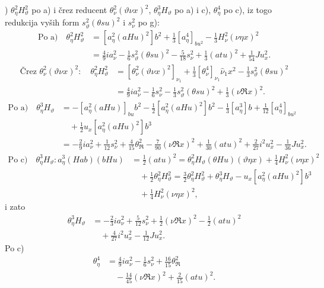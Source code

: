 \documentclass[11pt]{article}
\newcommand{\R}{\mathfrak R}
\begin{document}
) $\theta_\eta^2H_\vartheta^2$ po \mbox{a)} i črez reducent $\theta_\nu^2(\vartheta\nu x)^2$, $\theta_\eta^3H_\vartheta$ po \mbox{a)} i \mbox{c)}, $\theta_\eta^4$ po \mbox{c)}, iz togo redukcija vyših form $s_\vartheta^2(\theta su)^2$ i $s_\nu^2$ po \mbox{g)}:
\begingroup\scriptsize
\[
\begin{aligned}
\text{Po }\mathrm{a)}\quad
\theta_\eta^2H_\vartheta^2&=[a_\eta^2(aHu)^2]b^2+\frac13[a_\eta^4]_{bu^2}-\frac13H_\nu^2(\nu\eta x)^2\\
&=\frac49ia_\nu^2-\frac16s_\vartheta^2(\theta su)^2-\frac5{18}s_\nu^2+\frac13(atu)^2+\frac1{54}Ju_x^2.
\end{aligned}
\]
\[
\begin{aligned}
\text{Črez }\theta_\nu^2(\vartheta\nu x)^2:
\quad\theta_\eta^2H_\vartheta^2
&=[\theta_\nu^2(\vartheta\nu x)^2]_{\nu_1}+\frac13[\theta_\nu^4]_{\nu_1}\hat\nu_1x^2-\frac13s_\vartheta^2(\theta su)^2\\
&=\frac49ia_\nu^2-\frac16s_\nu^2-\frac13s_\vartheta^2(\theta su)^2+\frac13(\nu\R x)^2.
\end{aligned}
\]
\[
\begin{aligned}
\text{Po }\mathrm{a)}\quad
\theta_\eta^3H_\vartheta&=-[a_\eta^2(aHu)]_{bu}b^2-\frac12[a_\eta^2(aHu)^2]b^2-\frac13[a_\eta^3]b+\frac1{12}[a_\eta^4]_{bu^2}\\
&\quad+\frac12u_x[a_\eta^2(aHu)^2]b^3\\
&=-\frac29ia_\nu^2+\frac1{12}s_\nu^2+\frac4{15}\theta_\R^2-\frac7{90}(\nu\R x)^2+\frac1{30}(atu)^2+\frac2{27}i^2u_x^2-\frac1{36}Ju_x^2.
\end{aligned}
\]
\[
\begin{aligned}
\text{Po }\mathrm{c)}\quad
\theta_\eta^3H_\vartheta:
 a_\eta^3(Hab)(bHu)&=\frac12(atu)^2
=\theta_\eta^2H_\vartheta(\theta Hu)(\vartheta\eta x)+\frac14H_\nu^2(\nu\eta x)^2\\
&\quad+\frac12\theta_\eta^2H_\vartheta^2
=\frac32\theta_\eta^2H_\vartheta^2+\theta_\eta^3H_\vartheta-u_x[a_\eta^2(aHu)^2]b^3\\
&\quad+\frac14H_\nu^2(\nu\eta x)^2,
\end{aligned}
\]
\endgroup
i zato
\begingroup\small
\[
\begin{aligned}
\theta_\eta^3H_\vartheta&=-\frac23ia_\nu^2+\frac5{12}s_\nu^2+\frac12(\nu\R x)^2-\frac12(atu)^2\\
&\quad+\frac4{27}i^2u_x^2-\frac1{12}Ju_x^2.
\end{aligned}
\]
Po \mbox{c)}
\[
\begin{aligned}
\theta_\eta^4&=\frac49ia_\nu^2-\frac16s_\nu^2+\frac{16}{15}\theta_\R^2\\
&\quad-\frac{14}{45}(\nu\R x)^2+\frac2{15}(atu)^2.
\end{aligned}
\]
\end{document}
